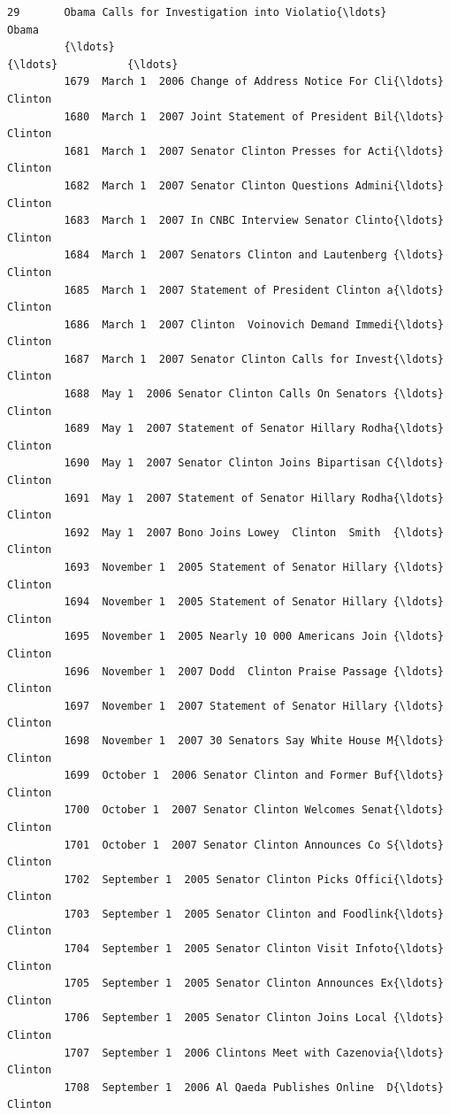 \documentclass[11pt]{article}
\begin{document}
\begin{Verbatim}[commandchars=\\\{\}]
         29       Obama Calls for Investigation into Violatio{\ldots}         Obama   
         {\ldots}                                                 {\ldots}           {\ldots}   
         1679  March 1  2006 Change of Address Notice For Cli{\ldots}       Clinton   
         1680  March 1  2007 Joint Statement of President Bil{\ldots}       Clinton   
         1681  March 1  2007 Senator Clinton Presses for Acti{\ldots}       Clinton   
         1682  March 1  2007 Senator Clinton Questions Admini{\ldots}       Clinton   
         1683  March 1  2007 In CNBC Interview Senator Clinto{\ldots}       Clinton   
         1684  March 1  2007 Senators Clinton and Lautenberg {\ldots}       Clinton   
         1685  March 1  2007 Statement of President Clinton a{\ldots}       Clinton   
         1686  March 1  2007 Clinton  Voinovich Demand Immedi{\ldots}       Clinton   
         1687  March 1  2007 Senator Clinton Calls for Invest{\ldots}       Clinton   
         1688  May 1  2006 Senator Clinton Calls On Senators {\ldots}       Clinton   
         1689  May 1  2007 Statement of Senator Hillary Rodha{\ldots}       Clinton   
         1690  May 1  2007 Senator Clinton Joins Bipartisan C{\ldots}       Clinton   
         1691  May 1  2007 Statement of Senator Hillary Rodha{\ldots}       Clinton   
         1692  May 1  2007 Bono Joins Lowey  Clinton  Smith  {\ldots}       Clinton   
         1693  November 1  2005 Statement of Senator Hillary {\ldots}       Clinton   
         1694  November 1  2005 Statement of Senator Hillary {\ldots}       Clinton   
         1695  November 1  2005 Nearly 10 000 Americans Join {\ldots}       Clinton   
         1696  November 1  2007 Dodd  Clinton Praise Passage {\ldots}       Clinton   
         1697  November 1  2007 Statement of Senator Hillary {\ldots}       Clinton   
         1698  November 1  2007 30 Senators Say White House M{\ldots}       Clinton   
         1699  October 1  2006 Senator Clinton and Former Buf{\ldots}       Clinton   
         1700  October 1  2007 Senator Clinton Welcomes Senat{\ldots}       Clinton   
         1701  October 1  2007 Senator Clinton Announces Co S{\ldots}       Clinton   
         1702  September 1  2005 Senator Clinton Picks Offici{\ldots}       Clinton   
         1703  September 1  2005 Senator Clinton and Foodlink{\ldots}       Clinton   
         1704  September 1  2005 Senator Clinton Visit Infoto{\ldots}       Clinton   
         1705  September 1  2005 Senator Clinton Announces Ex{\ldots}       Clinton   
         1706  September 1  2005 Senator Clinton Joins Local {\ldots}       Clinton   
         1707  September 1  2006 Clintons Meet with Cazenovia{\ldots}       Clinton   
         1708  September 1  2006 Al Qaeda Publishes Online  D{\ldots}       Clinton   
         

\end{Verbatim}
\end{document}
